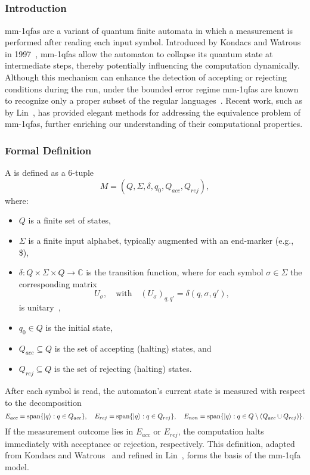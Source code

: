 \subsection{}
\label{sec:mmqfa}

\subsubsection{Introduction}
\glspl{mm-1qfa} are a variant of quantum finite automata in which a measurement is performed after reading each input symbol. Introduced by Kondacs and Watrous in 1997~\cite{kondacs1997power}, \glspl{mm-1qfa} allow the automaton to collapse its quantum state at intermediate steps, thereby potentially influencing the computation dynamically. Although this mechanism can enhance the detection of accepting or rejecting conditions during the run, under the bounded error regime \glspl{mm-1qfa} are known to recognize only a proper subset of the regular languages~\cite{brodsky2002characterizations}. Recent work, such as by Lin~\cite{lin2012another}, has provided elegant methods for addressing the equivalence problem of \glspl{mm-1qfa}, further enriching our understanding of their computational properties.

\subsubsection{Formal Definition}
A  is defined as a 6-tuple
\[
M = (Q,\Sigma,\delta,q_0,Q_{acc},Q_{rej}),
\]
where:
\begin{itemize}
    \item $Q$ is a finite set of states,
    \item $\Sigma$ is a finite input alphabet, typically augmented with an end-marker (e.g., \$),
    \item $\delta : Q \times \Sigma \times Q \to \mathbb{C}$ is the transition function, where for each symbol $\sigma\in\Sigma$ the corresponding matrix 
    \[
    U_\sigma,\quad \text{with} \quad (U_\sigma)_{q,q'}=\delta(q,\sigma,q'),
    \]
    is unitary~\cite{kondacs1997power},
    \item $q_0 \in Q$ is the initial state,
    \item $Q_{acc} \subseteq Q$ is the set of accepting (halting) states, and
    \item $Q_{rej} \subseteq Q$ is the set of rejecting (halting) states.
\end{itemize}
After each symbol is read, the automaton's current state is measured with respect to the decomposition
\[
E_{acc} = \text{span}\{\ket{q} : q \in Q_{acc}\},\quad
E_{rej} = \text{span}\{\ket{q} : q \in Q_{rej}\},\quad
E_{non} = \text{span}\{\ket{q} : q \in Q \setminus (Q_{acc}\cup Q_{rej})\}.
\]
If the measurement outcome lies in $E_{acc}$ or $E_{rej}$, the computation halts immediately with acceptance or rejection, respectively. This definition, adapted from Kondacs and Watrous~\cite{kondacs1997power} and refined in Lin~\cite{lin2012another}, forms the basis of the \gls{mm-1qfa} model.

